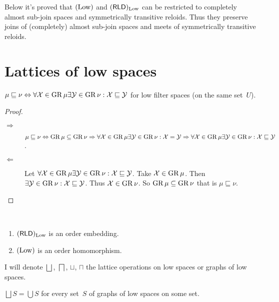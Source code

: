 Below it's proved that $(\operatorname{Low})$ and $(\mathsf{RLD})_{\operatorname{Low}}$ can be restricted to completely almost sub-join spaces and symmetrically transitive reloids.
Thus they preserve joins of (completely) almost sub-join spaces and meets of symmetrically transitive reloids.

\section{Lattices of low spaces}

\begin{prop}\label{ls-order2}
$\mu \sqsubseteq \nu \Leftrightarrow \forall \mathcal{X}\in\operatorname{GR}\mu \exists\mathcal{Y}\in\operatorname{GR}\nu: \mathcal{X}\sqsubseteq\mathcal{Y}$ for
low filter spaces (on the same set~$U$).
\end{prop}

\begin{proof}
~
\begin{description}
\item[$\Rightarrow$] $\mu \sqsubseteq \nu \Leftrightarrow \operatorname{GR}\mu\subseteq\operatorname{GR}\nu \Rightarrow
  \forall \mathcal{X}\in\operatorname{GR}\mu \exists\mathcal{Y}\in\operatorname{GR}\nu: \mathcal{X}=\mathcal{Y} \Rightarrow
  \forall \mathcal{X}\in\operatorname{GR}\mu \exists\mathcal{Y}\in\operatorname{GR}\nu: \mathcal{X}\sqsubseteq\mathcal{Y}$.
\item[$\Leftarrow$] Let $\forall \mathcal{X}\in\operatorname{GR}\mu \exists\mathcal{Y}\in\operatorname{GR}\nu: \mathcal{X}\sqsubseteq\mathcal{Y}$.
  Take $\mathcal{X}\in\operatorname{GR}\mu$. Then $\exists\mathcal{Y}\in\operatorname{GR}\nu: \mathcal{X}\sqsubseteq\mathcal{Y}$. Thus $\mathcal{X}\in\operatorname{GR}\nu$.
  So $\operatorname{GR}\mu\subseteq\operatorname{GR}\nu$ that is $\mu \sqsubseteq \nu$.
\end{description}
\end{proof}

\begin{obvious}
~
\begin{enumerate}
\item $(\mathsf{RLD})_{\operatorname{Low}}$ is an order embedding.
\item $(\operatorname{Low})$ is an order homomorphism.
\end{enumerate}
\end{obvious}

I will denote $\bigsqcup$, $\bigsqcap$, $\sqcup$, $\sqcap$ the lattice operations on low spaces or graphs of low spaces.

\begin{prop}
$\bigsqcup S=\bigcup S$ for every set~$S$ of graphs of low spaces on some set.
\end{prop}


